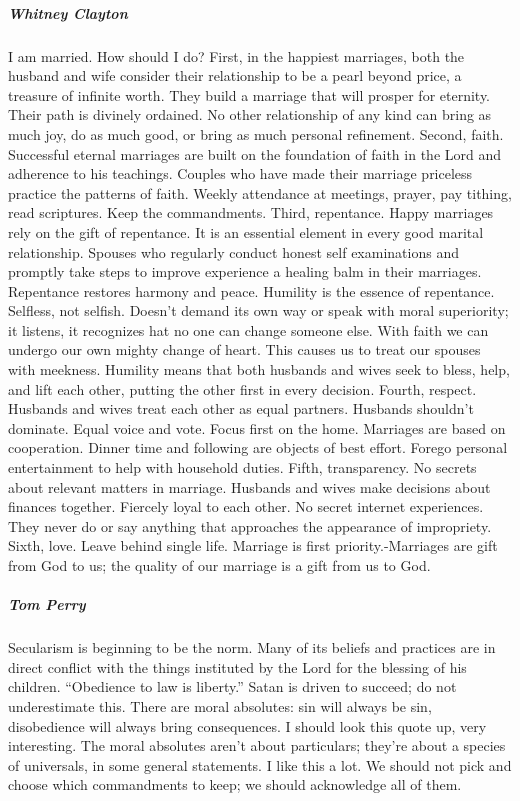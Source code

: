 \subparagraph*{Whitney Clayton} I am married. How should I do? First, in the happiest marriages, both the husband and wife consider their relationship to be a pearl beyond price, a treasure of infinite worth. They build a marriage that will prosper for eternity. Their path is divinely ordained. No other relationship of any kind can bring as much joy, do as much good, or bring as much personal refinement. Second, faith. Successful eternal marriages are built on the foundation of faith in the Lord and adherence to his teachings. Couples who have made their marriage priceless practice the patterns of faith. Weekly attendance at meetings, prayer, pay tithing, read scriptures. Keep the commandments. Third, repentance. Happy marriages rely on the gift of repentance. It is an essential element in every good marital relationship. Spouses who regularly conduct honest self examinations and promptly take steps to improve experience a healing balm in their marriages. Repentance restores harmony and peace. Humility is the essence of repentance. Selfless, not selfish. Doesn't demand its own way or speak with moral superiority; it listens, it recognizes hat no one can change someone else. With faith we can undergo our own mighty change of heart. This causes us to treat our spouses with meekness. Humility means that both husbands and wives seek to bless, help, and lift each other, putting the other first in every decision. Fourth, respect. Husbands and wives treat each other as equal partners. Husbands shouldn't dominate. Equal voice and vote. Focus first on the home. Marriages are based on cooperation. Dinner time and following are objects of best effort. Forego personal entertainment to help with household duties. Fifth, transparency. No secrets about relevant matters in marriage. Husbands and wives make decisions about finances together. Fiercely loyal to each other. No secret internet experiences. They never do or say anything that approaches the appearance of impropriety. Sixth, love. Leave behind single life. Marriage is first priority.-Marriages are gift from God to us; the quality of our marriage is a gift from us to God.

\subparagraph*{Tom Perry} Secularism is beginning to be the norm. Many of its beliefs and practices are in direct conflict with the things instituted by the Lord for the blessing of his children. ``Obedience to law is liberty.'' Satan is driven to succeed; do not underestimate this. There are moral absolutes: sin will always be sin, disobedience will always bring consequences. I should look this quote up, very interesting. The moral absolutes aren't about particulars; they're about a species of universals, in some general statements. I like this a lot. We should not pick and choose which commandments to keep; we should acknowledge all of them.

